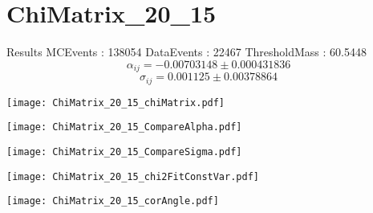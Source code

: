 \documentclass[a4paper,12pt]{article}
\begin{document}
\section{ChiMatrix\_20\_15}
\begin{minipage}{0.49\linewidth} Results \newline
MCEvents : 138054\newline
DataEvents : 22467 \newline
ThresholdMass : 60.5448\\
$$\alpha_{ij} = -0.00703148\pm 0.000431836$$
$$\sigma_{ij} = 0.001125\pm 0.00378864$$
\end{minipage}\hfill
\begin{minipage}{0.49\linewidth} 
\texttt{[image: ChiMatrix\_20\_15\_chiMatrix.pdf]}\\
\end{minipage}
\hfill
\begin{minipage}{0.49\linewidth} 
\texttt{[image: ChiMatrix\_20\_15\_CompareAlpha.pdf]}\\
\end{minipage}
\hfill
\begin{minipage}{0.49\linewidth} 
\texttt{[image: ChiMatrix\_20\_15\_CompareSigma.pdf]}\\
\end{minipage}
\begin{minipage}{0.49\linewidth} 
\texttt{[image: ChiMatrix\_20\_15\_chi2FitConstVar.pdf]}\\
\end{minipage}
\hfill
\begin{minipage}{0.49\linewidth} 
\texttt{[image: ChiMatrix\_20\_15\_corAngle.pdf]}\\
\end{minipage}
\end{document}
